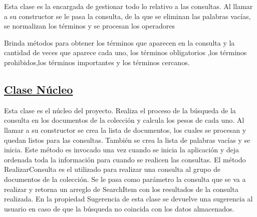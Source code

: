 \documentclass{article}%
\begin{document}
Esta clase es la encargada de gestionar todo lo relativo a las consultas. Al llamar a su constructor se le pasa la consulta, de la que se eliminan las palabras vacías, se normalizan los términos y se procesan los operadores

Brinda métodos para obtener los términos que aparecen en la consulta y la cantidad de veces que aparece cada uno, los términos obligatorios
,los términos prohibidos,los términos importantes y los términos cercanos. 
\subsection{\underline{Clase Núcleo}}
Esta clase es el núcleo del proyecto. Realiza el proceso de la búsqueda de la consulta en los documentos de la colección y calcula los pesos de cada uno.
Al llamar a su constructor se crea la lista de documentos, los cuales se procesan y quedan listos para las consultas. También se crea la lista de palabras vacías y se inicia. Este método es invocado una vez cuando se inicia la aplicación y deja ordenada toda la información para cuando se realicen las consultas.
El método RealizarConsulta es el utilizado para realizar una consulta al grupo de documentos de la colección. Se le pasa como parámetro la consulta que se va a realizar y retorna un arreglo de SearchItem con los resultados de la consulta realizada. En la propiedad Sugerencia de esta clase se devuelve una sugerencia al usuario en caso de que la búsqueda no coincida con los datos almacenados.
\end{document}

